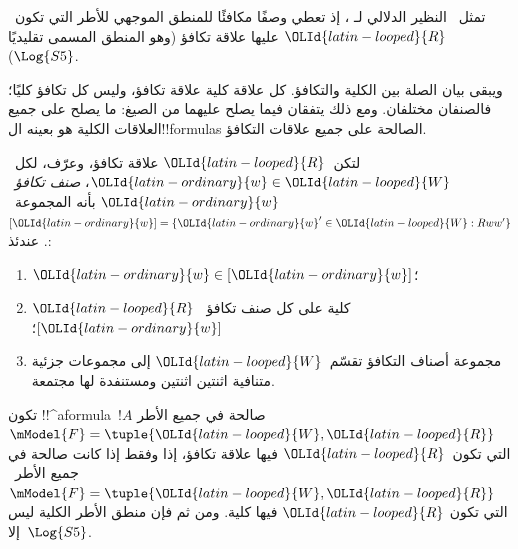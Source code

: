 \documentclass[../../../include/open-logic-section]{subfiles}
\begin{document}
تمثل~ النظير الدلالي لـ
، إذ تعطي وصفًا مكافئًا للمنطق الموجهي
للأطر التي تكون~$\OLId{latin-looped}{R}$ عليها علاقة تكافؤ (وهو المنطق المسمى تقليديًا
$\Log{S5}$).

ويبقى بيان الصلة بين الكلية والتكافؤ. كل علاقة كلية علاقة تكافؤ،
وليس كل تكافؤ كليًا؛ فالصنفان مختلفان. ومع ذلك يتفقان فيما يصلح
عليهما من الصيغ: ما يصلح على جميع العلاقات الكلية هو بعينه
ال!!{formula}s الصالحة على جميع علاقات التكافؤ.

\begin{prop}
  لتكن~$\OLId{latin-looped}{R}$ علاقة تكافؤ، وعرّف، لكل~$\OLId{latin-ordinary}{w} \in \OLId{latin-looped}{W}$، \emph{صنف تكافؤ}~$\OLId{latin-ordinary}{w}$
  بأنه المجموعة~$[\OLId{latin-ordinary}{w}] = \{\OLId{latin-ordinary}{w}'\in \OLId{latin-looped}{W} : Rww'\}$. عندئذ:
  \begin{enumerate}
  \item $\OLId{latin-ordinary}{w} \in [\OLId{latin-ordinary}{w}]$؛
  \item $\OLId{latin-looped}{R}$ كلية على كل صنف تكافؤ~$[\OLId{latin-ordinary}{w}]$؛
  \item مجموعة أصناف التكافؤ تقسّم~$\OLId{latin-looped}{W}$ إلى مجموعات جزئية متنافية
    اثنتين اثنتين ومستنفدة لها مجتمعة.
  \end{enumerate}
\end{prop}

\begin{prop}
  تكون !!^a{formula}~$!A$ صالحة في جميع الأطر
  $\mModel{F} =\tuple{\OLId{latin-looped}{W},\OLId{latin-looped}{R}}$ التي تكون~$\OLId{latin-looped}{R}$ فيها علاقة تكافؤ، إذا وفقط
  إذا كانت صالحة في جميع الأطر~$\mModel{F} =\tuple{\OLId{latin-looped}{W},\OLId{latin-looped}{R}}$ التي تكون
  $\OLId{latin-looped}{R}$ فيها كلية. ومن ثم فإن منطق الأطر الكلية ليس إلا~$\Log{S5}$.
\end{prop}
\end{document}
